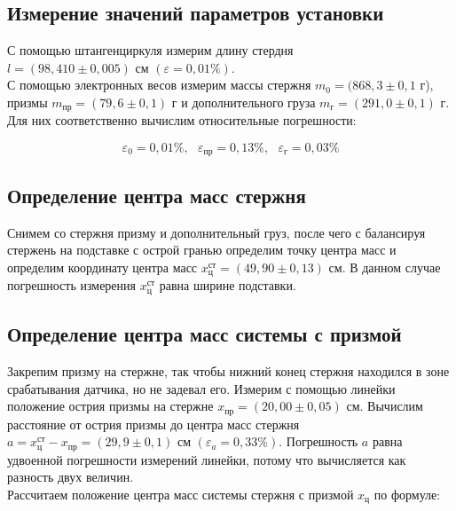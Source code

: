 \documentclass[a4paper,12pt]{article}
\begin{document}
\subsection{Измерение значений параметров установки}

С помощью штангенциркуля измерим длину стердня $l = (98,410 \pm 0,005) \text{ см  } (\varepsilon = 0,01 \%)$. \\

С помощью электронных весов измерим массы стержня $m_\text{0} = (868,3 \pm 0,1 \text{ г}$), призмы $m_\text{пр} = (79,6 \pm 0,1) \text{ г}$ и дополнительного груза $m_\text{г} = (291,0 \pm 0,1) \text{ г}$. Для них соответственно вычислим относительные погрешности:

\begin{equation}
    \varepsilon_\text{0} = 0,01 \%, \text{        } \varepsilon_\text{пр} = 0,13 \%, \text{        }  \varepsilon_\text{г} = 0,03 \%
\end{equation}

\subsection{Определение центра масс стержня}

Снимем со стержня призму и дополнительный груз, после чего с балансируя стержень на подставке с острой гранью определим точку центра масс и определим координату центра масс $x_\text{ц}^\text{ст} = (49,90 \pm 0,13) \text{ см}$. В данном случае погрешность измерения $x_\text{ц}^\text{ст}$ равна ширине подставки.

\subsection{Определение центра масс системы с призмой}

Закрепим призму на стержне, так чтобы нижний конец стержня находился в зоне срабатывания датчика, но не задевал его. Измерим с помощью линейки положение острия призмы на стержне
$x_\text{пр} = (20,00 \pm 0,05) \text{ см}$. Вычислим расстояние от острия призмы до центра масс стержня \\$a = x_\text{ц}^\text{ст} - x_\text{пр} = (29,9 \pm 0,1) \text{ см } (\varepsilon_a = 0,33 \%)$. Погрешность $a$ равна удвоенной погрешности измерений линейки, потому что вычисляется как разность двух величин.\\

Рассчитаем положение центра масс системы стержня с призмой $x_\text{ц}$ по формуле:
\end{document}
